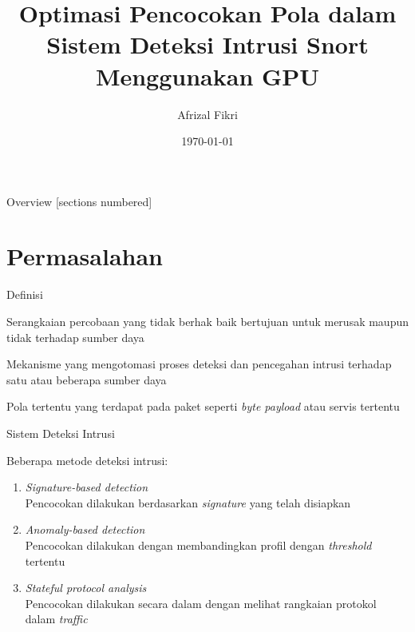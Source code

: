 \documentclass[10pt]{beamer}
\title{Optimasi Pencocokan Pola dalam Sistem Deteksi Intrusi Snort Menggunakan GPU}
\date{\today}
\author{Afrizal Fikri}
\institute{13513004}
\begin{document}
\maketitle

\begin{frame}{Overview}
    [sections numbered]
    \tableofcontents[hideallsubsections]
\end{frame}

\section{Permasalahan}

\begin{frame}[fragile]{Definisi}
    \begin{Ldescription}

        \item[Intrusi] Serangkaian percobaan yang tidak berhak baik bertujuan untuk merusak maupun tidak terhadap sumber daya

        \item[Sistem deteksi intrusi] Mekanisme yang mengotomasi proses deteksi dan pencegahan intrusi terhadap satu atau beberapa sumber daya

        \item[\emph{Signature}] Pola tertentu yang terdapat pada paket seperti \emph{byte payload} atau servis tertentu

    \end{Ldescription}
\end{frame}

\begin{frame}[fragile]{Sistem Deteksi Intrusi}

    Beberapa metode deteksi intrusi:
    \begin{enumerate}
        
        \item \emph{Signature-based detection} \\
        Pencocokan dilakukan berdasarkan \emph{signature} yang telah disiapkan
        
        \item \emph{Anomaly-based detection} \\
        Pencocokan dilakukan dengan membandingkan profil dengan \emph{threshold} tertentu
        
        \item \emph{Stateful protocol analysis} \\
        Pencocokan dilakukan secara dalam dengan melihat rangkaian protokol dalam \emph{traffic}
    
    \end{enumerate}    
\end{frame}
\end{document}
